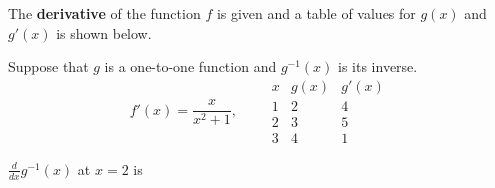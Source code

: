 \documentclass{ximera}
\author{Gregory Hartman \and Matthew Carr}
\begin{document}
\begin{exercise}



The \textbf{derivative} of the function $f$ is given and a table of values for $g(x)$ and $g'(x)$ is shown below.

Suppose that $g$ is a one-to-one function and $g^{-1}(x)$ is its inverse.
\[
f'(x)=\frac{x}{x^2+1},\qquad
\begin{array}{c|c|c}
x & g(x) & g'(x)\\ \hline
1 & 2 & 4\\ \hline
2 & 3 & 5\\ \hline
3 & 4 & 1
\end{array}
\]

$\frac{d}{dx}g^{-1}(x)$ at $x=2$ is
\begin{prompt}
\begin{multipleChoice}
\end{multipleChoice}
\end{prompt}

\end{exercise}
\end{document}
